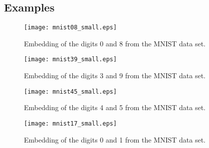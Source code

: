 \documentclass[10pt,twocolumn]{article}
\numberwithin{equation}{section}
\begin{document}
\subsection{Examples}
\label{sec:some-embedd-exampl}
\begin{figure}[htbp]
  \begin{center}
    \texttt{[image: mnist08\_small.eps]}
    \caption{Embedding of the digits 0 and 8 from the MNIST data
      set. }
    \label{fig:mnist08_ect}
  \end{center}
\end{figure}    

\begin{figure}[htbp]
  \begin{center}
    \texttt{[image: mnist39\_small.eps]}
    \caption{Embedding of the digits 3 and 9 from the MNIST data
      set. }
    \label{fig:mnist39_ect}
  \end{center}
\end{figure}    

\begin{figure}[htbp]
  \begin{center}
    \texttt{[image: mnist45\_small.eps]}
  \caption{Embedding of the digits 4 and 5 from the MNIST data
    set. }
    \label{fig:mnist45_ect}
  \end{center}
\end{figure}    

\begin{figure}[htbp]
  \begin{center}
      \texttt{[image: mnist17\_small.eps]}
  \caption{Embedding of the digits 0 and 1 from the MNIST data
    set. }
    \label{fig:mnist17_ect}
  \end{center}
\end{figure}    
\end{document}
